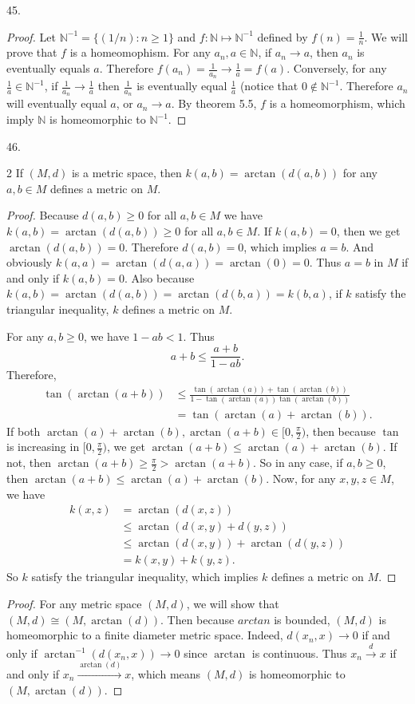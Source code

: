 \documentclass[12pt, a4paper]{article}
\theoremstyle{plain}
\newcommand{\N}{\mathbb{N}}
\begin{document}
45.
\begin{proof}
Let $\N^{-1}=\{(1/n):n\geq 1\}$ and $f:\N\mapsto \N^{-1}$ defined by $f(n)=\frac{1}{n}$. We will prove that $f$ is a homeomophism. For any $a_n,a\in \N$, if $a_n\rightarrow a$, then $a_n$ is eventually equals $a$. Therefore $f(a_n)=\frac{1}{a_n}\rightarrow \frac{1}{a}=f(a)$. Conversely, for any $\frac{1}{a}\in \N^{-1}$, if $\frac{1}{a_n}\rightarrow \frac{1}{a}$ then $\frac{1}{a_n}$ is eventually equal $\frac{1}{a}$ (notice that $0\notin \N^{-1}$. Therefore $a_n$ will eventually equal $a$, or $a_n\rightarrow a$. By theorem 5.5, $f$ is a homeomorphism, which imply $\N$ is homeomorphic to $\N^{-1}$.
\end{proof}

\pagebreak

46.
\begin{lemma}2
If $(M,d)$ is a metric space, then $k(a,b)=\arctan(d(a,b))$ for any $a,b\in M$ defines a metric on $M$.
\end{lemma}
\begin{proof}
Because $d(a,b)\geq 0$ for all $a,b\in M$ we have $k(a,b)=\arctan(d(a,b))\geq 0$ for all $a,b\in M$. If $k(a,b)=0$, then we get $\arctan(d(a,b))=0$. Therefore $d(a,b)=0$, which implies $a=b$. And obviously $k(a,a)=\arctan(d(a,a))=\arctan(0)=0$. Thus $a=b$ in $M$ if and only if $k(a,b)=0$. Also because $k(a,b)=\arctan(d(a,b))=\arctan(d(b,a))=k(b,a)$, if $k$ satisfy the triangular inequality, $k$ defines a metric on $M$. 

For any $a,b\geq 0$, we have $1-ab<1$. Thus
\[
a+b\leq\frac{a+b}{1-ab}.
\]
Therefore,
\begin{align*}
\tan(\arctan(a+b))&\leq \frac{\tan(\arctan(a))+\tan(\arctan(b))}{1-\tan(\arctan(a))\tan(\arctan(b))}\\
&=\tan(\arctan(a)+\arctan(b)).
\end{align*}
If both $\arctan(a)+\arctan(b), \arctan(a+b)\in [0,\frac{\pi}{2})$, then because $\tan$ is increasing in $[0,\frac{\pi}{2})$, we get $\arctan(a+b)\leq \arctan(a)+\arctan(b)$. If not, then $\arctan(a+b)\geq \frac{\pi}{2}>\arctan(a+b)$. So in any case, if $a,b\geq 0$, then $\arctan(a+b)\leq \arctan(a)+\arctan(b)$. Now, for any $x,y,z\in M$, we have
\begin{align*}
k(x,z)&=\arctan(d(x,z))\\
&\leq \arctan(d(x,y)+d(y,z))\\
&\leq \arctan(d(x,y))+\arctan(d(y,z))\\
&=k(x,y)+k(y,z).
\end{align*}
So $k$ satisfy the triangular inequality, which implies $k$ defines a metric on $M$.
\end{proof}
\begin{proof}
For any metric space $(M,d)$, we will show that $(M,d)\cong (M,\arctan(d))$. Then because $arctan$ is bounded, $(M,d)$ is homeomorphic to a finite diameter metric space. Indeed, $d(x_n,x)\rightarrow 0$ if and only if $\arctan^{-1}(d(x_n,x))\rightarrow 0$ since $\arctan$ is continuous. Thus $x_n\xrightarrow{d}x$ if and only if $x_n\xrightarrow{\arctan(d)}x$, which means $(M,d)$ is homeomorphic to $(M,\arctan(d))$.
\end{proof}
\end{document}
